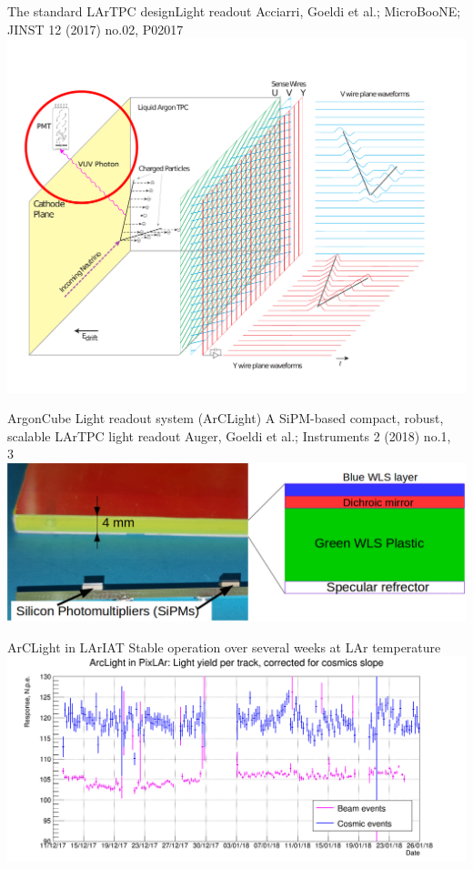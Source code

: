 \documentclass[]{beamer}
\newcommand*{\emphcoltitle}{blue}
\newcommand*{\AC}{{ArgonCube}}
\newcommand*{\AL}{{ArCLight}}
\newcommand*{\uboone}{{MicroBooNE}}
\newcommand*{\lariat}{{LArIAT}}
\newcommand*{\lar}{{LAr}}
\newcommand*{\lartpc}{{LArTPC}}
\begin{document}
\begin{frame}{The standard \lartpc{} design}{Light readout}
	{\tiny Acciarri, Goeldi et al.; \uboone{}; JINST 12 (2017) no.02, P02017~\cite{uboone}}\\
	\centering
	\includegraphics[viewport=30 40 720 540, clip, height=.66\textheight]{defence/TPCprinciple_light-ro}
\end{frame}

\begin{frame}{\AC{} Light readout system (\AL{})}{\color{\emphcoltitle} A SiPM-based compact, robust, scalable \lartpc{} light readout}
	{\tiny Auger, Goeldi et al.; Instruments 2 (2018) no.1, 3~\cite{arclight}}\\
	\centering
	\includegraphics[width=\textwidth]{arclight/structure}
\end{frame}

\begin{frame}{\AL{} in \lariat{}}{\color{\emphcoltitle} Stable operation over several weeks at \lar{} temperature}
	\centering
	\includegraphics[viewport=0 0 1445 600, clip, width=\textwidth]{defence/LY_for_Damian}
\end{frame}
\end{document}
